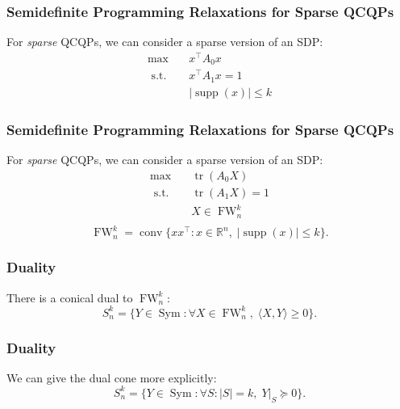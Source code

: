 \documentclass{beamer}
\DeclareMathOperator{\Sym}{Sym}
\newcommand{\R}{\mathbb{R}}
\DeclareMathOperator*{\supp}{supp}
\DeclareMathOperator{\conv}{\operatorname{conv}}
\DeclareMathOperator{\FW}{FW}
\DeclareMathOperator{\tr}{tr}
\newcommand{\st}{{\text{ s.t. }}}
\begin{document}
\begin{frame}
\frametitle{Semidefinite Programming Relaxations for Sparse QCQPs}
    For \emph{sparse} QCQPs, we can consider a sparse version of an SDP:
    \begin{equation}
        \begin{aligned}
            \max\quad & x^{\intercal}A_0x\\
            \st & x^{\intercal}A_1x = 1\\
                &|\supp(x)| \le k
        \end{aligned}
    \end{equation}
\end{frame}
\begin{frame}
\frametitle{Semidefinite Programming Relaxations for Sparse QCQPs}
    For \emph{sparse} QCQPs, we can consider a sparse version of an SDP:
    \begin{equation}
        \begin{aligned}
            \max\quad & \tr(A_0X)\\
            \st & \tr(A_1X) = 1\\
                & X \in \FW^k_n\\
        \end{aligned}
    \end{equation}
    \pause 
    \[
        \FW^k_n = \conv \{xx^{\intercal} : x\in \R^n,\;|\supp(x)| \le k\}.
    \]
\end{frame}
\begin{frame}
    \frametitle{Duality}
    There is a conical dual to $\FW^k_n$:
    \[
        S^k_n = \{Y \in \Sym : \forall X \in \FW^k_n,\;\langle X, Y \rangle \ge 0\}.
    \]
\end{frame}
\begin{frame}
    \frametitle{Duality}
    We can give the dual cone more explicitly:
    \[
        S^k_n = \{Y \in \Sym : \forall S : |S| = k, \;Y|_S \succeq 0\}.
    \]
\end{frame}
\end{document}
